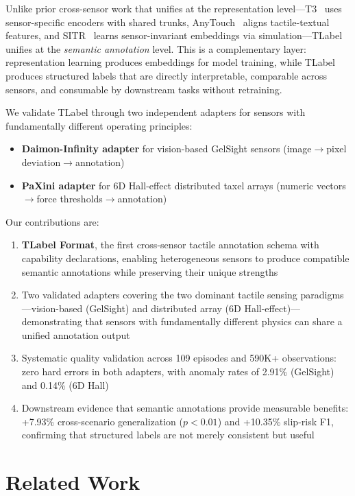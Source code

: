 \documentclass[conference]{IEEEtran}
\begin{document}
Unlike prior cross-sensor work that unifies at the representation level---T3~\cite{zhao2024t3} uses sensor-specific encoders with shared trunks, AnyTouch~\cite{feng2025anytouch} aligns tactile-textual features, and SITR~\cite{sitr2025} learns sensor-invariant embeddings via simulation---TLabel unifies at the \emph{semantic annotation} level. This is a complementary layer: representation learning produces embeddings for model training, while TLabel produces structured labels that are directly interpretable, comparable across sensors, and consumable by downstream tasks without retraining.

We validate TLabel through two independent adapters for sensors with fundamentally different operating principles:
\begin{itemize}
\item \textbf{Daimon-Infinity adapter} for vision-based GelSight sensors (image$\rightarrow$pixel deviation$\rightarrow$annotation)
\item \textbf{PaXini adapter} for 6D Hall-effect distributed taxel arrays (numeric vectors$\rightarrow$force thresholds$\rightarrow$annotation)
\end{itemize}

Our contributions are:
\begin{enumerate}
\item \textbf{TLabel Format}, the first cross-sensor tactile annotation schema with capability declarations, enabling heterogeneous sensors to produce compatible semantic annotations while preserving their unique strengths
\item Two validated adapters covering the two dominant tactile sensing paradigms---vision-based (GelSight) and distributed array (6D Hall-effect)---demonstrating that sensors with fundamentally different physics can share a unified annotation output
\item Systematic quality validation across 109 episodes and 590K+ observations: zero hard errors in both adapters, with anomaly rates of 2.91\% (GelSight) and 0.14\% (6D Hall)
\item Downstream evidence that semantic annotations provide measurable benefits: +7.93\% cross-scenario generalization ($p<0.01$) and +10.35\% slip-risk F1, confirming that structured labels are not merely consistent but useful
\end{enumerate}

\section{Related Work}
\end{document}
